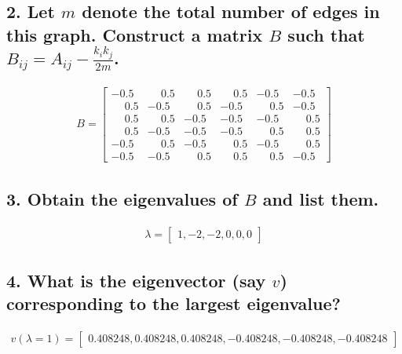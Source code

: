 \documentclass{tufte-handout}
\begin{document}
\subsection{2. Let $m$ denote the total number of edges in this graph. Construct a matrix $B$ such that $B_{ij} =A_{ij} - \frac{k_ik_j}{2m}$.}


\begin{align*}
B =
\begin{bmatrix}
 -0.5 &  \phantom{-}0.5 &  \phantom{-}0.5 &  \phantom{-}0.5 & -0.5 & -0.5 \\
  \phantom{-}0.5 & -0.5 &  \phantom{-}0.5 & -0.5 &  \phantom{-}0.5 & -0.5 \\
  \phantom{-}0.5 &  \phantom{-}0.5 & -0.5 & -0.5 & -0.5 &  \phantom{-}0.5 \\
  \phantom{-}0.5 & -0.5 & -0.5 & -0.5 &  \phantom{-}0.5 &  \phantom{-}0.5 \\
 -0.5 &  \phantom{-}0.5 & -0.5 &  \phantom{-}0.5 & -0.5 &  \phantom{-}0.5 \\
 -0.5 & -0.5 &  \phantom{-}0.5 &  \phantom{-}0.5 &  \phantom{-}0.5 & -0.5
\end{bmatrix}
\end{align*}

\subsection{3. Obtain the eigenvalues of $B$ and list them.}

\begin{align*}
\lambda =
\begin{bmatrix} 1, -2, -2, 0, 0, 0
\end{bmatrix}
\end{align*}

\subsection{4. What is the eigenvector (say $v$) corresponding to the largest eigenvalue?}

\begin{align*}
v(\lambda = 1) =
\begin{bmatrix} 0.408248, 0.408248, 0.408248, -0.408248, -0.408248, -0.408248
\end{bmatrix}
\end{align*}
\end{document}
